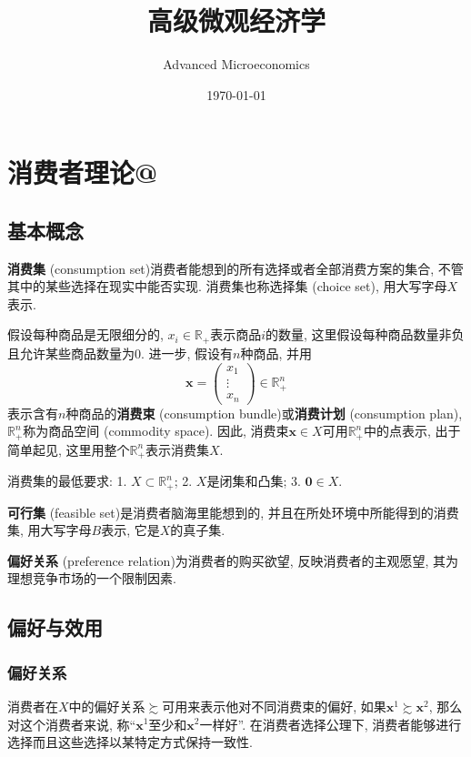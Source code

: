 \documentclass[cn, 12pt, math=mtpro2, bibstyle=apa, blue, twocol]{elegantbook}
\title{高级微观经济学}
\subtitle{Advanced Microeconomics}
\date{\today}
\makeatletter
\newcommand*{\rom}[1]{\expandafter\@slowromancap\romannumeral #1@}
\newcommand{\R}{\mathbb{R}}
\newcommand{\x}{\mathbf{x}}
\makeatother
\begin{document}
\maketitle
\frontmatter

\tableofcontents

\mainmatter
\chapter{消费者理论\rom{1}}
\section{基本概念}
\textbf{消费集} (consumption set)消费者能想到的所有选择或者全部消费方案的集合, 不管其中的某些选择在现实中能否实现. 消费集也称选择集 (choice set), 用大写字母$X$表示.

假设每种商品是无限细分的, $x_i\in\R_+$表示商品$i$的数量, 这里假设每种商品数量非负且允许某些商品数量为0. 进一步, 假设有$n$种商品, 并用
$$\x=\begin{pmatrix}
      x_1 \\
      \vdots \\
      x_n
    \end{pmatrix}\in \R^n_+$$
表示含有$n$种商品的\textbf{消费束} (consumption bundle)或\textbf{消费计划} (consumption plan), $\R^n_+$称为商品空间 (commodity space). 因此, 消费束$\x\in X$可用$\R^n_+$中的点表示, 出于简单起见, 这里用整个$\R^n_+$表示消费集$X$.

\begin{postulate}\label{pos:pos1.1}
消费集的最低要求: 1. $X\subset \R_+^n$; 2. $X$是闭集和凸集; 3. $\mathbf{0}\in X$.
\end{postulate}

\textbf{可行集} (feasible set)是消费者脑海里能想到的, 并且在所处环境中所能得到的消费集, 用大写字母$B$表示, 它是$X$的真子集.

\textbf{偏好关系} (preference relation)为消费者的购买欲望, 反映消费者的主观愿望, 其为理想竞争市场的一个限制因素.
\section{偏好与效用}
\subsection{偏好关系}
消费者在$X$中的偏好关系$\succsim$可用来表示他对不同消费束的偏好, 如果$\x^1\succsim\x^2$, 那么对这个消费者来说, 称“$\x^1$至少和$\x^2$一样好”. 在消费者选择公理下, 消费者能够进行选择而且这些选择以某特定方式保持一致性.
\end{document}
